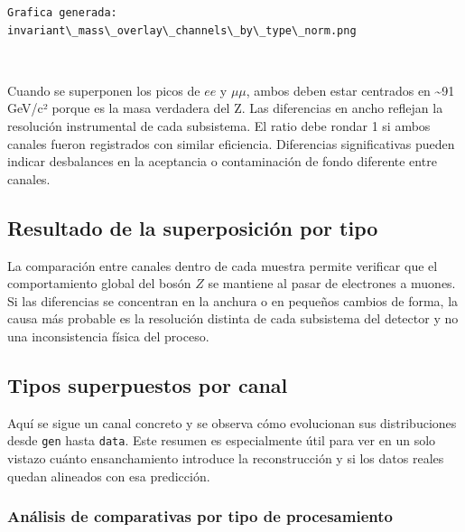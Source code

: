 \documentclass[11pt]{article}
\begin{document}
    \begin{Verbatim}[commandchars=\\\{\}]
Grafica generada: invariant\_mass\_overlay\_channels\_by\_type\_norm.png
    \end{Verbatim}

    \begin{center}
    \end{center}
    { \hspace*{\fill} \\}
    
    Cuando se superponen los picos de \(ee\) y \(\mu\mu\), ambos deben estar
centrados en \textasciitilde91 GeV/c² porque es la masa verdadera del Z.
Las diferencias en ancho reflejan la resolución instrumental de cada
subsistema. El ratio debe rondar 1 si ambos canales fueron registrados
con similar eficiencia. Diferencias significativas pueden indicar
desbalances en la aceptancia o contaminación de fondo diferente entre
canales.

    \hypertarget{resultado-de-la-superposiciuxf3n-por-tipo}{%
\subsection{Resultado de la superposición por
tipo}\label{resultado-de-la-superposiciuxf3n-por-tipo}}

    La comparación entre canales dentro de cada muestra permite verificar
que el comportamiento global del bosón \(Z\) se mantiene al pasar de
electrones a muones. Si las diferencias se concentran en la anchura o en
pequeños cambios de forma, la causa más probable es la resolución
distinta de cada subsistema del detector y no una inconsistencia física
del proceso.

    \hypertarget{tipos-superpuestos-por-canal}{%
\subsection{Tipos superpuestos por
canal}\label{tipos-superpuestos-por-canal}}

    Aquí se sigue un canal concreto y se observa cómo evolucionan sus
distribuciones desde \texttt{gen} hasta \texttt{data}. Este resumen es
especialmente útil para ver en un solo vistazo cuánto ensanchamiento
introduce la reconstrucción y si los datos reales quedan alineados con
esa predicción.

    \hypertarget{anuxe1lisis-de-comparativas-por-tipo-de-procesamiento}{%
\subsubsection{Análisis de comparativas por tipo de
procesamiento}\label{anuxe1lisis-de-comparativas-por-tipo-de-procesamiento}}
\end{document}
